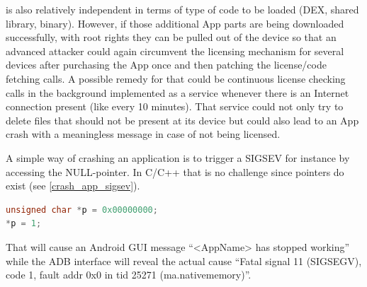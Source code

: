 is also relatively independent in terms of type of code to be loaded (DEX,
shared library, binary). However, if those additional App parts are being
downloaded successfully, with root rights they can be pulled out of the
device so that an advanced attacker could again circumvent the licensing
mechanism for several devices after purchasing the App once and then patching
the license/code fetching calls.
A possible remedy for that could be continuous license checking calls in the
background implemented as a service whenever there is an Internet connection
present (like every 10 minutes). That service could not only try to delete
files that should not be present at its device but could also lead to an
App crash with a meaningless message in case of not being licensed.

A simple way of crashing an application is to trigger a SIGSEV for instance
by accessing the NULL-pointer. In C/C++ that is no challenge since pointers
do exist (see \autoref{crash_app_sigsev}).
\begin{lstlisting}[language=C++, caption=crashApp(), label=crash_app_sigsev]
unsigned char *p = 0x00000000;
*p = 1;
\end{lstlisting}
That will cause an Android GUI message ``<AppName> has stopped working'' while
the ADB interface will reveal the actual cause ``Fatal signal 11 (SIGSEGV), code 1, fault addr 0x0 in tid 25271 (ma.nativememory)''.
